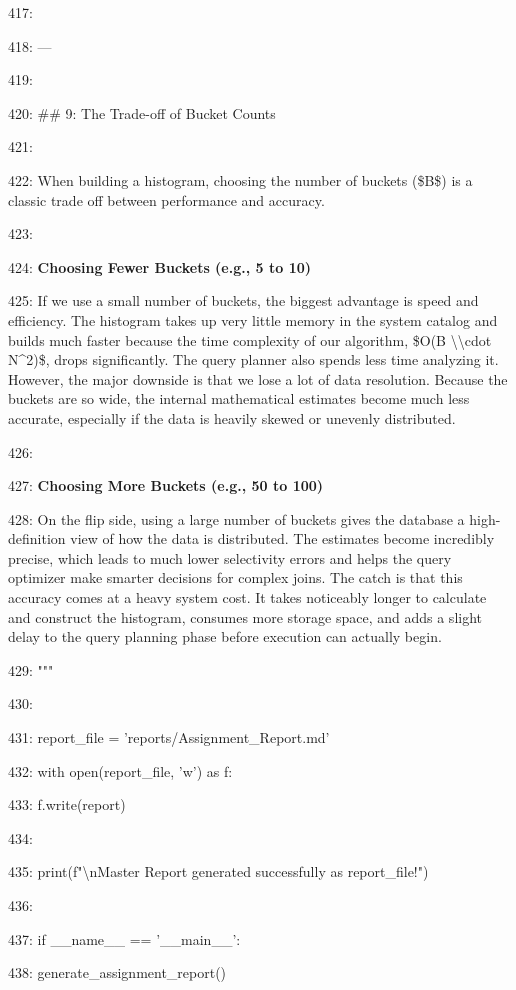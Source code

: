 \documentclass[11pt,a4paper]{article}
\begin{document}
417:

418: ---

419:

420: \#\# 9: The Trade-off of Bucket Counts

421:

422: When building a histogram, choosing the number of buckets (\$B\$) is a classic trade off between performance and accuracy.

423:

424: \textbf{Choosing Fewer Buckets (e.g., 5 to 10)}

425: If we use a small number of buckets, the biggest advantage is speed and efficiency. The histogram takes up very little memory in the system catalog and builds much faster because the time complexity of our algorithm, \$O(B \textbackslash{}\textbackslash{}cdot N\textasciicircum{}2)\$, drops significantly. The query planner also spends less time analyzing it. However, the major downside is that we lose a lot of data resolution. Because the buckets are so wide, the internal mathematical estimates become much less accurate, especially if the data is heavily skewed or unevenly distributed.

426:

427: \textbf{Choosing More Buckets (e.g., 50 to 100)}

428: On the flip side, using a large number of buckets gives the database a high-definition view of how the data is distributed. The estimates become incredibly precise, which leads to much lower selectivity errors and helps the query optimizer make smarter decisions for complex joins. The catch is that this accuracy comes at a heavy system cost. It takes noticeably longer to calculate and construct the histogram, consumes more storage space, and adds a slight delay to the query planning phase before execution can actually begin.

429: """

430:

431:     report\_file = 'reports/Assignment\_Report.md'

432:     with open(report\_file, 'w') as f:

433:         f.write(report)

434:

435:     print(f"\textbackslash{}nMaster Report generated successfully as {report\_file}!")

436:

437: if \_\_name\_\_ == '\_\_main\_\_':

438:     generate\_assignment\_report()
\end{document}
